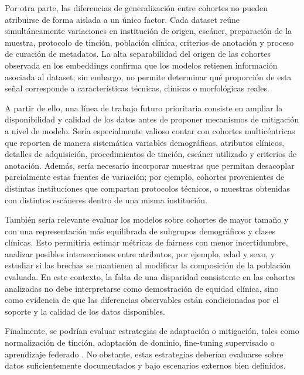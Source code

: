 Por otra parte, las diferencias de generalización entre cohortes no pueden atribuirse de forma aislada a un único factor. Cada dataset reúne simultáneamente variaciones en institución de origen, escáner, preparación de la muestra, protocolo de tinción, población clínica, criterios de anotación y proceso de curación de metadatos. La alta separabilidad del origen de las cohortes observada en los embeddings confirma que los modelos retienen información asociada al dataset; sin embargo, no permite determinar qué proporción de esta señal corresponde a características técnicas, clínicas o morfológicas reales.

A partir de ello, una línea de trabajo futuro prioritaria consiste en ampliar la disponibilidad y calidad de los datos antes de proponer mecanismos de mitigación a nivel de modelo. Sería especialmente valioso contar con cohortes multicéntricas que reporten de manera sistemática variables demográficas, atributos clínicos, detalles de adquisición, procedimientos de tinción, escáner utilizado y criterios de anotación. Además, sería necesario incorporar muestras que permitan desacoplar parcialmente estas fuentes de variación; por ejemplo, cohortes provenientes de distintas instituciones que compartan protocolos técnicos, o muestras obtenidas con distintos escáneres dentro de una misma institución.

También sería relevante evaluar los modelos sobre cohortes de mayor tamaño y con una representación más equilibrada de subgrupos demográficos y clases clínicas. Esto permitiría estimar métricas de fairness con menor incertidumbre, analizar posibles intersecciones entre atributos, por ejemplo, edad y sexo, y estudiar si las brechas se mantienen al modificar la composición de la población evaluada. En este contexto, la falta de una disparidad consistente en las cohortes analizadas no debe interpretarse como demostración de equidad clínica, sino como evidencia de que las diferencias observables están condicionadas por el soporte y la calidad de los datos disponibles.

Finalmente, se podrían evaluar estrategias de adaptación o mitigación, tales como normalización de tinción, adaptación de dominio, fine-tuning supervisado o aprendizaje federado \citep{Xu2025StainNormalization,Kumari2024DomainAdaptation,Zhang2024FederatedLearning}. No obstante, estas estrategias deberían evaluarse sobre datos suficientemente documentados y bajo escenarios externos bien definidos.